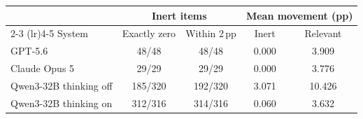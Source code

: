 \begin{tabular}{lcccc}
\toprule
& \multicolumn{2}{c}{Inert items} & \multicolumn{2}{c}{Mean movement (pp)} \\
\cmidrule(lr){2-3} \cmidrule(lr){4-5}
System & Exactly zero & Within 2\,pp & Inert & Relevant \\
\midrule
GPT-5.6 & 48/48 & 48/48 & 0.000 & 3.909 \\
Claude Opus 5 & 29/29 & 29/29 & 0.000 & 3.776 \\
Qwen3-32B thinking off & 185/320 & 192/320 & 3.071 & 10.426 \\
Qwen3-32B thinking on & 312/316 & 314/316 & 0.060 & 3.632 \\
\bottomrule
\end{tabular}
